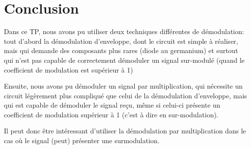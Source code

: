 \chapter{Conclusion}

Dans ce TP, nous avons pu utiliser deux techniques différentes de démodulation: tout d'abord la démodulation d'enveloppe, dont le circuit est simple à réaliser, mais qui demande des composants plus rares (diode au germanium) et surtout qui n'est pas capable de correctement démoduler un signal sur-modulé (quand le coefficient de modulation est supérieur à 1)

Ensuite, nous avons pu démoduler un signal par multiplication, qui nécessite un circuit légèrement plus compliqué que celui de la démodulation d'enveloppe, mais qui est capable de démoduler le signal reçu, même si celui-ci présente un coefficient de modulation supérieur à 1 (c'est à dire en sur-modulation).

Il peut donc être intéressant d'utiliser la démodulation par multiplication dans le cas où le signal (peut) présenter une surmodulation.